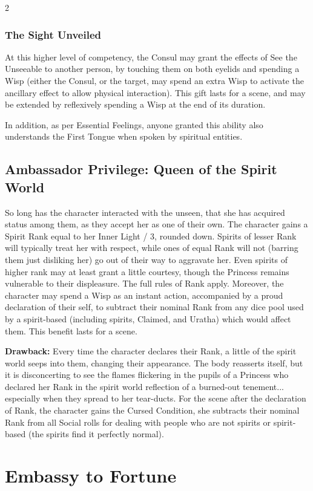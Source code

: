 \begin{multicols}{2}
\subsubsection*{The Sight Unveiled}
At this higher level of competency, the Consul may grant the effects of See the Unseeable to another person, by touching them on both eyelids and spending a Wisp (either the Consul, or the target, may spend an extra Wisp to activate the ancillary effect to allow physical interaction). This gift lasts for a scene, and may be extended by reflexively spending a Wisp at the end of its duration.

In addition, as per Essential Feelings, anyone granted this ability also understands the First Tongue when spoken by spiritual entities. 
\subsection*{Ambassador Privilege: Queen of the Spirit World }
So long has the character interacted with the unseen, that she has acquired status among them, as they accept her as one of their own. The character gains a Spirit Rank equal to her Inner Light / 3, rounded down. Spirits of lesser Rank will typically treat her with respect, while ones of equal Rank will not (barring them just disliking her) go out of their way to aggravate her. Even spirits of higher rank may at least grant a little courtesy, though the Princess remains vulnerable to their displeasure. The full rules of Rank apply. Moreover, the character may spend a Wisp as an instant action, accompanied by a proud declaration of their self, to subtract their nominal Rank from any dice pool used by a spirit-based (including spirits, Claimed, and Uratha) which would affect them. This benefit lasts for a scene.

\textbf{Drawback:} Every time the character declares their Rank, a little of the spirit world seeps into them, changing their appearance. The body reasserts itself, but it is disconcerting to see the flames flickering in the pupils of a Princess who declared her Rank in the spirit world reflection of a burned-out tenement... especially when they spread to her tear-ducts. For the scene after the declaration of Rank, the character gains the Cursed Condition, she subtracts their nominal Rank from all Social rolls for dealing with people who are not spirits or spirit-based (the spirits find it perfectly normal). 

\section*{Embassy to Fortune}
\label{sec:EmbassyFortune}


\end{multicols}
